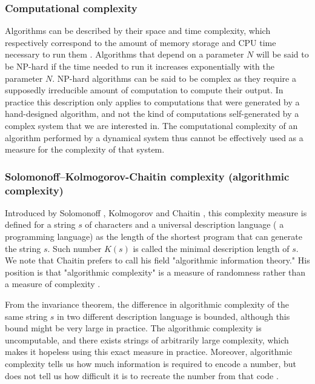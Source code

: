 \subsubsection{Computational complexity}
Algorithms can be described by their space and time complexity, which
respectively correspond to the amount of memory storage and CPU time necessary
to run them \parencite{traubInformationUncertaintyComplexity1983,
  packelRecentDevelopmentsInformationbased1987,
  hopcroftIntroductionAutomataTheory2007}. Algorithms that depend on a parameter
$N$ will be said to be NP-hard if the time needed to run it increases
exponentially with the parameter $N$. NP-hard algorithms can be said to be
complex as they require a supposedly irreducible amount of computation to
compute their output. In practice this description only applies to computations
that were generated by a hand-designed algorithm, and not the kind of
computations self-generated by a complex system that we are interested in. The
computational complexity of an algorithm performed by a dynamical system thus
cannot be effectively used as a measure for the complexity of that system.

\subsubsection{Solomonoff–Kolmogorov-Chaitin complexity (algorithmic
  complexity)}

Introduced by Solomonoff \parencite{solomonoffPreliminaryReportGeneral1960},
Kolmogorov \parencite{kolmogorovThreeApproachesQuantitative1968} and Chaitin
\parencite{chaitinLengthProgramsComputing1969,
  chaitinAlgorithmicInformationTheory1977,
  chaitinInformationRandomnessIncompleteness1990}, this complexity measure is
defined for a string $s$ of characters and a universal description language (\eg
a programming language) as the length of the shortest program that can generate
the string $s$. Such number $K(s)$ is called the minimal description length of
$s$. We note that Chaitin prefers to call his field "algorithmic information
theory." His position is that "algorithmic complexity" is a measure of
randomness rather than a measure of complexity
\parencite{chaitinInformationRandomnessIncompleteness1990}.

From the invariance theorem, the difference in algorithmic complexity of the same
string $s$ in two different description language is bounded, although this bound
might be very large in practice. The algorithmic complexity is uncomputable, and
there exists strings of arbitrarily large complexity, which makes it hopeless
using this exact measure in practice. Moreover, algorithmic complexity tells us
how much information is required to encode a number, but does not tell us how
difficult it is to recreate the number from that code
\parencite{gell-mannSimplicityComplexityDescription1988}.

